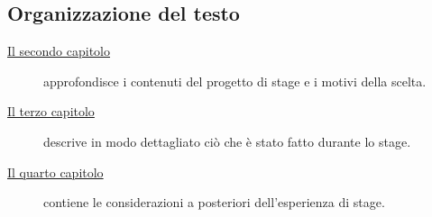 \subsection{Organizzazione del testo}

\begin{description}

    \item[{\hyperref[cap:analisi-requisiti]{Il secondo capitolo}}] approfondisce i contenuti del progetto di stage e i motivi della scelta.

    \item[{\hyperref[cap:progettazione-realizzazione]{Il terzo capitolo}}] descrive in modo dettagliato ciò che è stato fatto durante lo stage.

    \item[{\hyperref[cap:valutazione-retrospettiva]{Il quarto capitolo}}] contiene le considerazioni a posteriori dell'esperienza di stage.

\end{description}


